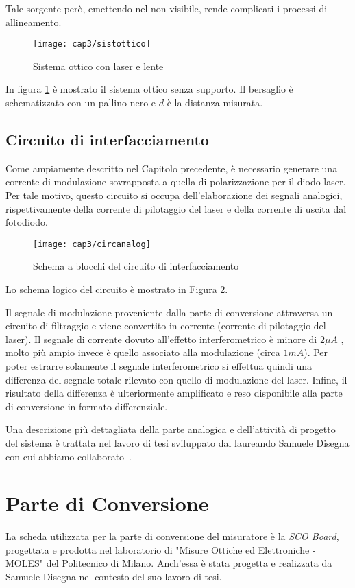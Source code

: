 Tale sorgente però, emettendo nel non visibile, rende complicati i processi di allineamento.
\begin{figure}  
  \begin{center}
    \texttt{[image: cap3/sistottico]}
    \caption{Sistema ottico con laser e lente}
    \label{sistottico}
  \end{center}
\end{figure}
In figura \ref{sistottico} è mostrato il sistema ottico senza supporto. Il bersaglio è schematizzato con un pallino nero e $d$ è la distanza misurata.

\subsection{Circuito di interfacciamento}
Come ampiamente descritto nel Capitolo precedente, è necessario generare una corrente di modulazione sovrapposta a quella di polarizzazione per il diodo laser. Per tale motivo, questo circuito si occupa dell'elaborazione dei segnali analogici, rispettivamente della corrente di pilotaggio del laser e della corrente di uscita dal fotodiodo.
\begin{figure}  
  \begin{center}
    \texttt{[image: cap3/circanalog]}
    \caption{Schema a blocchi del circuito di interfacciamento}
    \label{circanalog}
  \end{center}
\end{figure}

Lo schema logico del circuito è mostrato in Figura \ref{circanalog}. 

Il segnale di modulazione proveniente dalla parte di conversione attraversa un circuito di filtraggio e viene convertito in corrente (corrente di pilotaggio del laser).
Il segnale di corrente dovuto all'effetto interferometrico è minore di $2 \mu A$ , molto più ampio invece è quello associato alla modulazione (circa $1mA$). Per poter estrarre solamente il segnale interferometrico si effettua quindi una differenza del segnale totale rilevato con quello di modulazione del laser. Infine, il risultato della differenza è ulteriormente amplificato e reso disponibile alla parte di conversione in formato differenziale.

Una descrizione più dettagliata della parte analogica e dell'attività di progetto del sistema è trattata nel lavoro di tesi sviluppato dal laureando Samuele Disegna con cui abbiamo collaborato~\cite{thesissmldis}.

\section{Parte di Conversione}
La scheda utilizzata per la parte di conversione del misuratore è la \textit{SCO Board}, progettata e prodotta nel laboratorio di "Misure Ottiche ed Elettroniche - MOLES" del Politecnico di Milano. Anch'essa è stata progetta e realizzata da Samuele Disegna nel contesto del suo lavoro di tesi.

